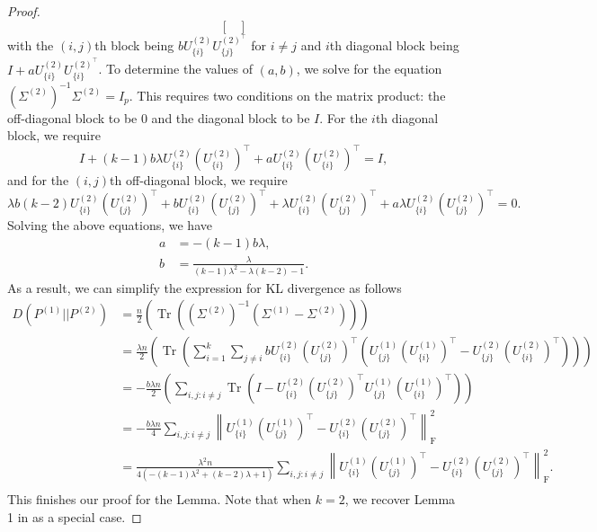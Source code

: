 \documentclass[11pt]{article}
\newcommand{\dc}[1]{\{#1\}} %
\DeclareMathOperator{\Tr}{Tr}
\newcommand{\0}{{\mathbf{0}}}
\begin{document}
\begin{proof}
\begin{equation*}
\begin{bmatrix}
\end{bmatrix}
\end{equation*}
with the $(i,j)$th block being $bU_{\dc{i}}^{(2)}U_{\dc{j}}^{{(2)}^\top}$ for $i\neq j$ and $i$th diagonal block being $I + aU_{\dc{i}}^{(2)}U_{\dc{i}}^{{(2)}^\top}$. To determine the values of $(a,b)$, we solve for the equation $(\Sigma^{(2)})^{-1}\Sigma^{(2)}=I_p$. This requires two conditions on the matrix product: the off-diagonal block to be 0 and the diagonal block to be $I$. For the $i$th diagonal block, we require\begin{equation*}
    I+(k-1)b\lambda U_{\dc{i}}^{(2)}(U_{\dc{i}}^{(2)})^{\top}+aU_{\dc{i}}^{(2)}(U_{\dc{i}}^{(2)})^{\top}=I,
\end{equation*}
and for the $(i,j)$th off-diagonal block, we require\begin{equation*}
    \lambda b (k-2) U_{\dc{i}}^{(2)}(U_{\dc{j}}^{(2)})^{\top} + bU_{\dc{i}}^{(2)}(U_{\dc{j}}^{(2)})^{\top} +\lambda U_{\dc{i}}^{(2)}(U_{\dc{j}}^{(2)})^{\top} +a\lambda U_{\dc{i}}^{(2)}(U_{\dc{j}}^{(2)})^{\top}=0.
\end{equation*}
Solving the above equations, we have \begin{align*}
    a &= -(k-1)b\lambda,\\
    b &= \frac{\lambda}{(k-1)\lambda^2-\lambda(k-2)-1}.
\end{align*}
As a result, we can simplify the expression for KL divergence as follows
\begin{align*}
    D(P^{(1)}||P^{(2)}) &=\frac{n}{2} \left(\Tr\left( (\Sigma^{(2)})^{-1} \left(\Sigma^{(1)} - \Sigma^{(2)}\right)\right)\right)\\
    &= \frac{\lambda n}{2}\left(\Tr\left(\sum_{i=1}^k \sum_{j\neq i}bU_{\dc{i}}^{(2)}(U_{\dc{j}}^{(2)})^{\top}\left(U_{\dc{j}}^{(1)}(U_{\dc{i}}^{(1)})^{\top}-U_{\dc{j}}^{(2)}(U_{\dc{i}}^{(2)})^{\top}\right) \right)\right)\\
    &= -\frac{b\lambda n}{2}\left(\sum_{i, j:i\neq j}\Tr\left(I-U_{\dc{i}}^{(2)}(U_{\dc{j}}^{(2)})^{\top}U_{\dc{j}}^{(1)}(U_{\dc{i}}^{(1)})^{\top}\right)\right)\\
    &= -\frac{b\lambda n}{4} \sum_{i, j:i\neq j}\left\|U_{\dc{i}}^{(1)}(U_{\dc{j}}^{(1)})^{\top}-U_{\dc{i}}^{(2)}(U_{\dc{j}}^{(2)})^{\top} \right\|_\mathrm{F}^2\\
    &= \frac{\lambda^2 n}{4\left(-(k-1)\lambda^2+(k-2)\lambda+1\right)}\sum_{i, j:i\neq j}\left\|U_{\dc{i}}^{(1)}(U_{\dc{j}}^{(1)})^{\top}-U_{\dc{i}}^{(2)}(U_{\dc{j}}^{(2)})^{\top}\right\|_\mathrm{F}^2.\\
\end{align*}
This finishes our proof for the Lemma. Note that when $k=2$, we recover Lemma 1 in \cite{gao2015supplement} as a special case.


\end{proof}
\end{document}
